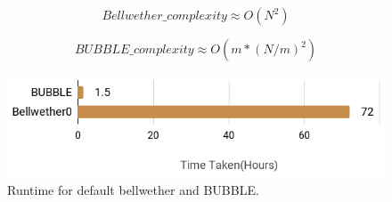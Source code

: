 \documentclass[10pt,journal,compsoc]{IEEEtran}
\begin{document}
\begin{equation}
\label{eq:bellwether}
    Bellwether\_complexity  \approx O(N^2)
\end{equation}

\begin{equation}
\label{eq:BUBBLE}
    BUBBLE\_complexity \approx O(m*(N/m)^2)
\end{equation}


\begin{figure}
    \centering
    \includegraphics[width=\linewidth]{figs/time.png}
    \caption{Runtime for default bellwether and BUBBLE.}
    \label{fig:time}
\end{figure}
\end{document}
